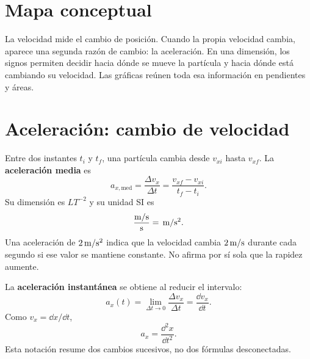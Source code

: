 \documentclass[11pt]{article}
\begin{document}

\tableofcontents
\inicioContenido

\section{Mapa conceptual}


La velocidad mide el cambio de posición. Cuando la propia velocidad cambia,
aparece una segunda razón de cambio: la aceleración. En una dimensión, los
signos permiten decidir hacia dónde se mueve la partícula y hacia dónde está
cambiando su velocidad. Las gráficas reúnen toda esa información en pendientes
y áreas.

\section{Aceleración: cambio de velocidad}

Entre dos instantes \(t_i\) y \(t_f\), una partícula cambia desde
\(v_{xi}\) hasta \(v_{xf}\). La \textbf{aceleración media} es
\[
  a_{x,\mathrm{med}}
  =
  \frac{\Delta v_x}{\Delta t}
  =
  \frac{v_{xf}-v_{xi}}{t_f-t_i}.
\]
Su dimensión es \(LT^{-2}\) y su unidad SI es
\[
  \frac{\mathrm{m/s}}{\mathrm{s}}
  =
  \,\mathrm{m/s^2}.
\]
Una aceleración de \(2\,\mathrm{m/s^2}\) indica que la velocidad cambia
\(2\,\mathrm{m/s}\) durante cada segundo si ese valor se mantiene constante.
No afirma por sí sola que la rapidez aumente.

La \textbf{aceleración instantánea} se obtiene al reducir el intervalo:
\[
  a_x(t)
  =
  \lim_{\Delta t\to0}\frac{\Delta v_x}{\Delta t}
  =
  \frac{\dd v_x}{\dd t}.
\]
Como \(v_x=\dd x/\dd t\),
\[
  a_x=\frac{\dd^2x}{\dd t^2}.
\]
Esta notación resume dos cambios sucesivos, no dos fórmulas desconectadas.
\end{document}
